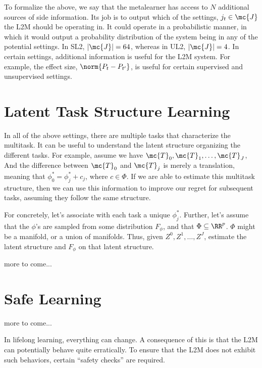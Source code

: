 \documentclass{article}
\begin{document}
To formalize the above, we say that the metalearner has access to $N$ additional sources of side information.  Its job is to output which of the settings, $j_t \in \mc{J}$ the L2M should be operating in. It could operate in a probabilistic manner, in which it would output a probability distribution of the system being in any of the potential settings.  In SL2, $|\mc{J}|=64$, whereas in UL2, $|\mc{J}|=4$.  In certain settings, additional information is useful for the L2M system. For example, the effect size,  $\norm{P_t - P_{t'}}$, is useful for certain supervised and unsupervised settings. 



\section{Latent Task Structure Learning}
\label{sec:struct}


In all of the above settings, there are multiple tasks that characterize the multitask.  It can be useful to understand the latent structure organizing the different tasks.  For example, assume we have $\mc{T}_0, \mc{T}_1, \ldots, \mc{T}_J$, And the difference between $\mc{T}_0$ and $\mc{T}_j$ is merely a translation, meaning that $\phi_0^* = \phi_j^* + c_j$, where $c \in \Phi$. If we are able to estimate this multitask structure, then we can use this information to improve our regret for subsequent tasks, assuming they follow the same structure.  

For concretely, let's associate with each task a unique $\phi^*_j$.  Further, let's assume that the $\phi$'s are sampled from some distribution $F_\phi$, and that $\Phi \subseteq \RR^p$.  $\Phi$ might be a manifold, or a union of manifolds. Thus, given $Z^0, Z^1, \ldots, Z^J$, estimate the latent structure and $F_\phi$ on that latent structure.   

more to come...

\section{Safe Learning}
\label{sec:safe}

more to come...

In lifelong learning, everything can change.  A consequence of this is that the L2M can potentially behave quite erratically.  To ensure that the L2M does not exhibit such behaviors, certain ``safety checks'' are required.  
\end{document}
